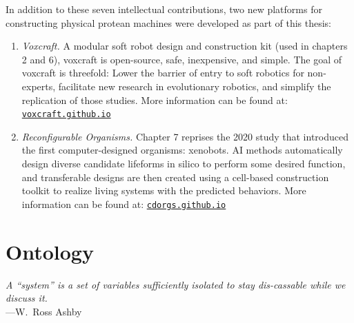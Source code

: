 \vspace{1em}

\noindent
In addition to these seven intellectual contributions, 
two new platforms for constructing physical protean machines were developed as part of this thesis:

\begin{enumerate}
    \item \textit{Voxcraft.} A modular soft robot design and construction kit (used in chapters 2 and 6), 
    voxcraft is open-source, safe, inexpensive, and simple.
    The goal of voxcraft is threefold:
    Lower the barrier of entry to soft robotics for non-experts,
    facilitate new research in evolutionary robotics,
    and simplify the replication of those studies.
    More information can be found at:
    \href{https://voxcraft.github.io/}{\color{blue}\texttt{voxcraft.github.io}}
    
    
    \item \textit{Reconfigurable Organisms.} Chapter 7 reprises the 2020 study that introduced the first computer-designed organisms: xenobots.
    AI methods automatically design diverse candidate lifeforms in silico to perform some desired function, and transferable designs are then created using a cell-based construction toolkit to realize living systems with the predicted behaviors. 
    More information can be found at: \href{https://cdorgs.github.io/}{\color{blue}\texttt{cdorgs.github.io}}

\end{enumerate}




\newpage
\section{Ontology}
\label{sec:ontology}

\begin{changemargin}{4em}{4em} 

\vspace{1em}

    \textit{A ``system'' is a set of variables sufficiently isolated to stay dis-cassable while we discuss it.} \\[4pt]
    \hspace*{16.5em} ---W.~Ross Ashby
    
\vspace{1em}
    
    
\end{changemargin}

